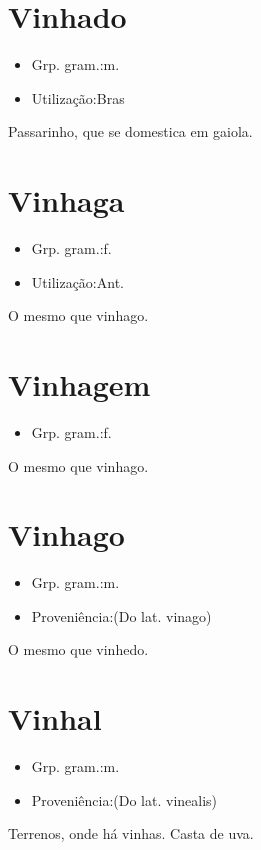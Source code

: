 \documentclass{article}
\begin{document}
\section{Vinhado}
\begin{itemize}
\item {Grp. gram.:m.}
\end{itemize}
\begin{itemize}
\item {Utilização:Bras}
\end{itemize}
Passarinho, que se domestica em gaiola.
\section{Vinhaga}
\begin{itemize}
\item {Grp. gram.:f.}
\end{itemize}
\begin{itemize}
\item {Utilização:Ant.}
\end{itemize}
O mesmo que \textunderscore vinhago\textunderscore .
\section{Vinhagem}
\begin{itemize}
\item {Grp. gram.:f.}
\end{itemize}
O mesmo que \textunderscore vinhago\textunderscore .
\section{Vinhago}
\begin{itemize}
\item {Grp. gram.:m.}
\end{itemize}
\begin{itemize}
\item {Proveniência:(Do lat. \textunderscore vinago\textunderscore )}
\end{itemize}
O mesmo que \textunderscore vinhedo\textunderscore .
\section{Vinhal}
\begin{itemize}
\item {Grp. gram.:m.}
\end{itemize}
\begin{itemize}
\item {Proveniência:(Do lat. \textunderscore vinealis\textunderscore )}
\end{itemize}
Terrenos, onde há vinhas.
Casta de uva.
\end{document}
